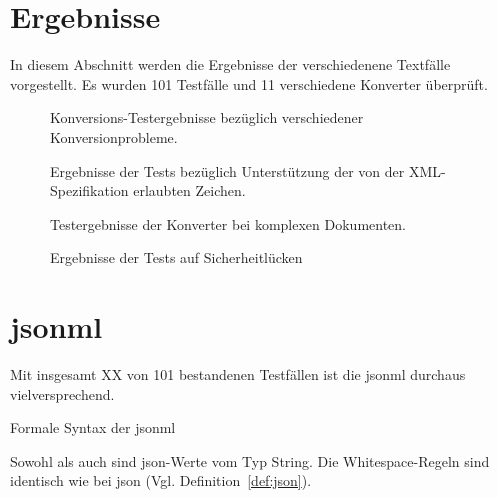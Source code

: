 \chapter{Ergebnisse} \label{chap:results}

In diesem Abschnitt werden die Ergebnisse der verschiedenene Textfälle vorgestellt. Es wurden 101 Testfälle und 11 verschiedene Konverter überprüft.


\begin{figure}[h!]
    \label{fig:results-basic}
    
    \caption{Konversions-Testergebnisse bezüglich verschiedener Konversionprobleme.}
\end{figure}

\begin{figure}[h!]
    \label{fig:results-chars}
    
    \caption{Ergebnisse der Tests bezüglich Unterstützung der von der XML-Spezifikation erlaubten Zeichen.}
\end{figure}

\begin{figure}[h!]
    \label{fig:results-complex}
    
    \caption{Testergebnisse der Konverter bei komplexen Dokumenten.}
\end{figure}

\begin{figure}[h!]
    \label{fig:results-sec}
    
    \caption{Ergebnisse der Tests auf Sicherheitlücken}
\end{figure}


\chapter{\acrfull{jsonml}}

Mit insgesamt XX von 101 bestandenen Testfällen ist die \acrfull{jsonml} durchaus vielversprechend.

\begin{definition}Formale Syntax der \acrfull{jsonml}
\label{def:jsonml}

Sowohl  als auch  sind \acrshort{json}-Werte vom Typ String. Die Whitespace-Regeln sind identisch wie bei \acrshort{json} (Vgl. Definition~\ref{def:json}).

\begin{grammar}
    
\end{grammar}
\end{definition}

